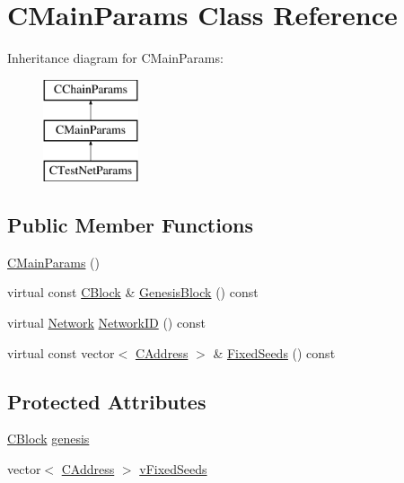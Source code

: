 \hypertarget{class_c_main_params}{}\section{C\+Main\+Params Class Reference}
\label{class_c_main_params}
Inheritance diagram for C\+Main\+Params\+:\begin{figure}[H]
\begin{center}
\leavevmode
\includegraphics[height=3.000000cm]{class_c_main_params}
\end{center}
\end{figure}
\subsection*{Public Member Functions}
\begin{DoxyCompactItemize}
\item 
\hyperlink{class_c_main_params_ab7dfebf3c4dd5cc0ebdfabe1111056d6}{C\+Main\+Params} ()
\item 
virtual const \hyperlink{class_c_block}{C\+Block} \& \hyperlink{class_c_main_params_a43228dcc868204da9bf20d2cb308d7f6}{Genesis\+Block} () const 
\item 
virtual \hyperlink{class_c_chain_params_a5c4bb1d7c0205399ff06ee58fab7f176}{Network} \hyperlink{class_c_main_params_aa798a88a27d4fae9fd8a967cef56c207}{Network\+I\+D} () const 
\item 
virtual const vector$<$ \hyperlink{class_c_address}{C\+Address} $>$ \& \hyperlink{class_c_main_params_ae9e7774ee70930e733518296c7846d9b}{Fixed\+Seeds} () const 
\end{DoxyCompactItemize}
\subsection*{Protected Attributes}
\begin{DoxyCompactItemize}
\item 
\hyperlink{class_c_block}{C\+Block} \hyperlink{class_c_main_params_a820a707a8769ce6b71bb61cfc6982fa5}{genesis}
\item 
vector$<$ \hyperlink{class_c_address}{C\+Address} $>$ \hyperlink{class_c_main_params_a25f9a0aabc628c122817c1358da75c33}{v\+Fixed\+Seeds}
\end{DoxyCompactItemize}
